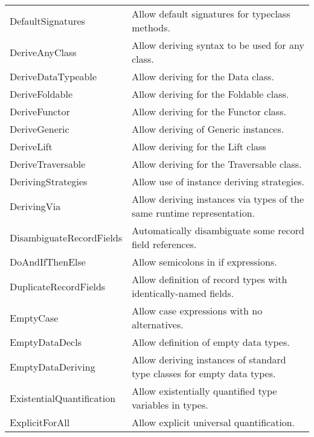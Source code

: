 \documentclass[openany, 12pt]{book}
\begin{document}
\begin{longtable}{ll}
	DefaultSignatures          & Allow default signatures for typeclass methods.                            \\
	DeriveAnyClass             & Allow deriving syntax to be used for any class.                            \\
	DeriveDataTypeable         & Allow deriving for the Data class.                                         \\
	DeriveFoldable             & Allow deriving for the Foldable class.                                     \\
	DeriveFunctor              & Allow deriving for the Functor class.                                      \\
	DeriveGeneric              & Allow deriving of Generic instances.                                       \\
	DeriveLift                 & Allow deriving for the Lift class                                          \\
	DeriveTraversable          & Allow deriving for the Traversable class.                                  \\
	DerivingStrategies         & Allow use of instance deriving strategies.                                 \\
	DerivingVia                & Allow deriving instances via types of the same runtime representation.     \\
	DisambiguateRecordFields   & Automatically disambiguate some record field references.                   \\
	DoAndIfThenElse            & Allow semicolons in if expressions.                                        \\
	DuplicateRecordFields      & Allow definition of record types with identically-named fields.            \\
	EmptyCase                  & Allow case expressions with no alternatives.                               \\
	EmptyDataDecls             & Allow definition of empty data types.                                      \\
	EmptyDataDeriving          & Allow deriving instances of standard type classes for empty data types.    \\
	ExistentialQuantification  & Allow existentially quantified type variables in types.                    \\
	ExplicitForAll             & Allow explicit universal quantification.                                   \\

\end{longtable}
\end{document}
